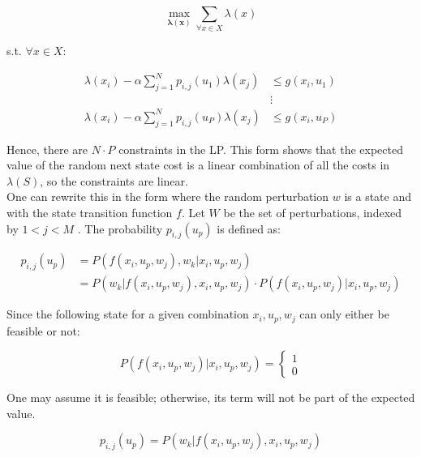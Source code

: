 \documentclass{article}
\begin{document}
	\begin{equation}
	\max_{\boldsymbol{\lambda(x)}} \sum_{\forall x \in X} \lambda(x)
	\end{equation}
	
	s.t. $\forall x \in X$:
	
	\begin{align*}
	\lambda(x_{i})-\alpha\sum_{j=1}^{N}p_{i,j}(u_{1})\lambda(x_{j}) &\leq g(x_{i},u_{1}) \\
	&\vdots\\
	\lambda(x_{i})-\alpha\sum_{j=1}^{N}p_{i,j}(u_{P})\lambda(x_{j}) &\leq g(x_{i},u_{P})
	\end{align*}
	
	Hence, there are $N\cdot P$ constraints in the LP. This form shows that the expected value of the random next state cost is a linear combination of all the costs in $\lambda(S)$, so the constraints are linear.\\
	
	One can rewrite this in the form where the random perturbation $w$ is a state and with the state transition function $f$. Let $W$ be the set of perturbations, indexed by $1<j<M$ . The probability $p_{i,j}(u_{p})$ is defined as:
	
	\begin{align*} 
	p_{i,j}(u_{p})&= P(f(x_{i},u_{p},w_{j}),w_{k} | x_{i},u_{p},w_{j}) \\ 
	&= P(w_{k} | f(x_{i},u_{p},w_{j}),x_{i},u_{p},w_{j})\cdot P(f(x_{i},u_{p},w_{j})| x_{i},u_{p},w_{j})
	\end{align*}
	
	Since the following state for a given combination $x_{i},u_{p},w_{j}$ can only either be feasible or not:
	
	\begin{displaymath}
	P(f(x_{i},u_{p},w_{j})| x_{i},u_{p},w_{j}) = 
	\left\{
	\begin{array}{l}
	1\\
	0
	\end{array}
	\right.
	\end{displaymath}
	
	One may assume it is feasible; otherwise, its term will not be part of the expected value.
	
	\begin{displaymath} 
	p_{i,j}(u_{p})=P(w_{k} | f(x_{i},u_{p},w_{j}),x_{i},u_{p},w_{j})
	\end{displaymath}
	
	
\end{document}
